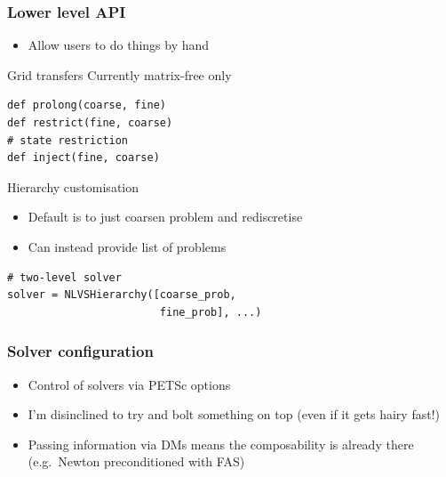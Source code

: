 \documentclass[presentation]{beamer}
\begin{document}
\begin{frame}[fragile]
  \frametitle{Lower level API}
  \begin{itemize}
  \item Allow users to do things by hand
  \end{itemize}
  \begin{block}{Grid transfers}
Currently matrix-free only

\begin{verbatim}
def prolong(coarse, fine)
def restrict(fine, coarse)
# state restriction
def inject(fine, coarse)
\end{verbatim}
  \end{block}

  \begin{block}{Hierarchy customisation}
    \begin{itemize}
    \item Default is to just coarsen problem and rediscretise
    \item Can instead provide list of problems
    \end{itemize}
\begin{verbatim}
# two-level solver
solver = NLVSHierarchy([coarse_prob,
                        fine_prob], ...)
\end{verbatim}
  \end{block}
\end{frame}
\begin{frame}
  \frametitle{Solver configuration}
  \begin{itemize}
  \item Control of solvers via PETSc options
  \item I'm disinclined to try and bolt something on top (even if it
    gets hairy fast!)
  \item Passing information via DMs means the composability is already
    there (e.g.~Newton preconditioned with FAS)
  \end{itemize}
\end{frame}

\end{document}

